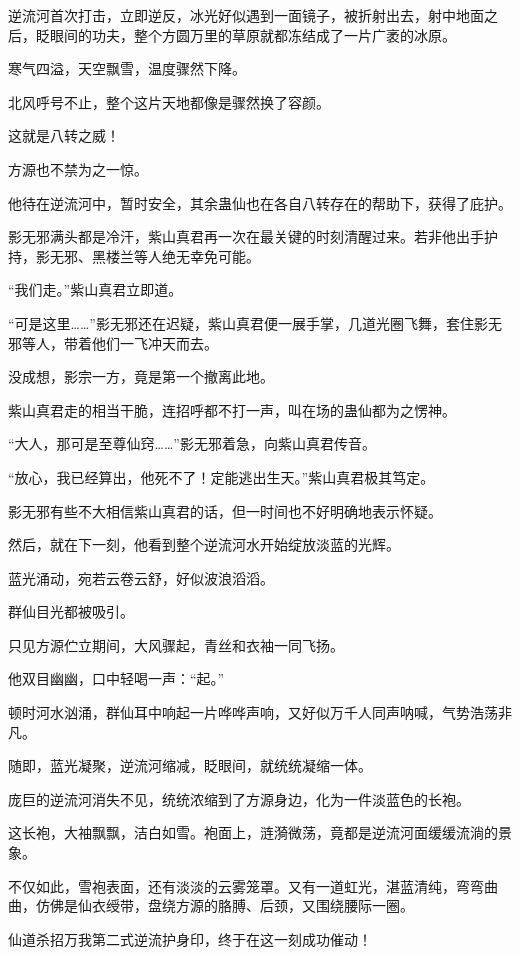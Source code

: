 \begin{this_body}
逆流河首次打击，立即逆反，冰光好似遇到一面镜子，被折射出去，射中地面之后，眨眼间的功夫，整个方圆万里的草原就都冻结成了一片广袤的冰原。

寒气四溢，天空飘雪，温度骤然下降。

北风呼号不止，整个这片天地都像是骤然换了容颜。

这就是八转之威！

方源也不禁为之一惊。

他待在逆流河中，暂时安全，其余蛊仙也在各自八转存在的帮助下，获得了庇护。

影无邪满头都是冷汗，紫山真君再一次在最关键的时刻清醒过来。若非他出手护持，影无邪、黑楼兰等人绝无幸免可能。

“我们走。”紫山真君立即道。

“可是这里……”影无邪还在迟疑，紫山真君便一展手掌，几道光圈飞舞，套住影无邪等人，带着他们一飞冲天而去。

没成想，影宗一方，竟是第一个撤离此地。

紫山真君走的相当干脆，连招呼都不打一声，叫在场的蛊仙都为之愣神。

“大人，那可是至尊仙窍……”影无邪着急，向紫山真君传音。

“放心，我已经算出，他死不了！定能逃出生天。”紫山真君极其笃定。

影无邪有些不大相信紫山真君的话，但一时间也不好明确地表示怀疑。

然后，就在下一刻，他看到整个逆流河水开始绽放淡蓝的光辉。

蓝光涌动，宛若云卷云舒，好似波浪滔滔。

群仙目光都被吸引。

只见方源伫立期间，大风骤起，青丝和衣袖一同飞扬。

他双目幽幽，口中轻喝一声：“起。”

顿时河水汹涌，群仙耳中响起一片哗哗声响，又好似万千人同声呐喊，气势浩荡非凡。

随即，蓝光凝聚，逆流河缩减，眨眼间，就统统凝缩一体。

庞巨的逆流河消失不见，统统浓缩到了方源身边，化为一件淡蓝色的长袍。

这长袍，大袖飘飘，洁白如雪。袍面上，涟漪微荡，竟都是逆流河面缓缓流淌的景象。

不仅如此，雪袍表面，还有淡淡的云雾笼罩。又有一道虹光，湛蓝清纯，弯弯曲曲，仿佛是仙衣绶带，盘绕方源的胳膊、后颈，又围绕腰际一圈。

仙道杀招万我第二式逆流护身印，终于在这一刻成功催动！


\end{this_body}

